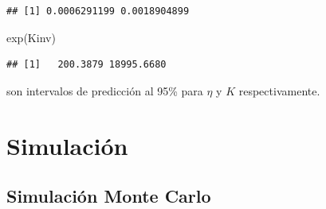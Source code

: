 \documentclass[
  12pt,
]{book}
\newenvironment{Shaded}{\begin{snugshade}}{\end{snugshade}}
\newcommand{\DecValTok}[1]{\textcolor[rgb]{0.00,0.00,0.81}{#1}}
\newcommand{\FloatTok}[1]{\textcolor[rgb]{0.00,0.00,0.81}{#1}}
\newcommand{\FunctionTok}[1]{\textcolor[rgb]{0.00,0.00,0.00}{#1}}
\newcommand{\NormalTok}[1]{#1}
\newcommand{\OtherTok}[1]{\textcolor[rgb]{0.56,0.35,0.01}{#1}}
\newcommand{\SpecialCharTok}[1]{\textcolor[rgb]{0.00,0.00,0.00}{#1}}
\theoremstyle{definition}
\theoremstyle{definition}
\theoremstyle{definition}
\theoremstyle{definition}
\theoremstyle{remark}
\begin{document}
\begin{Shaded}
\end{Shaded}

\begin{verbatim}
## [1] 0.0006291199 0.0018904899
\end{verbatim}

\begin{Shaded}
\begin{Highlighting}[]
\FunctionTok{exp}\NormalTok{(Kinv)}
\end{Highlighting}
\end{Shaded}

\begin{verbatim}
## [1]   200.3879 18995.6680
\end{verbatim}

son intervalos de predicción al 95\% para \(\eta\) y \(K\) respectivamente.

\hypertarget{simulaciuxf3n}{%
\section{Simulación}\label{simulaciuxf3n}}

\hypertarget{simulaciuxf3n-monte-carlo}{%
\subsection{Simulación Monte Carlo}\label{simulaciuxf3n-monte-carlo}}
\end{document}
